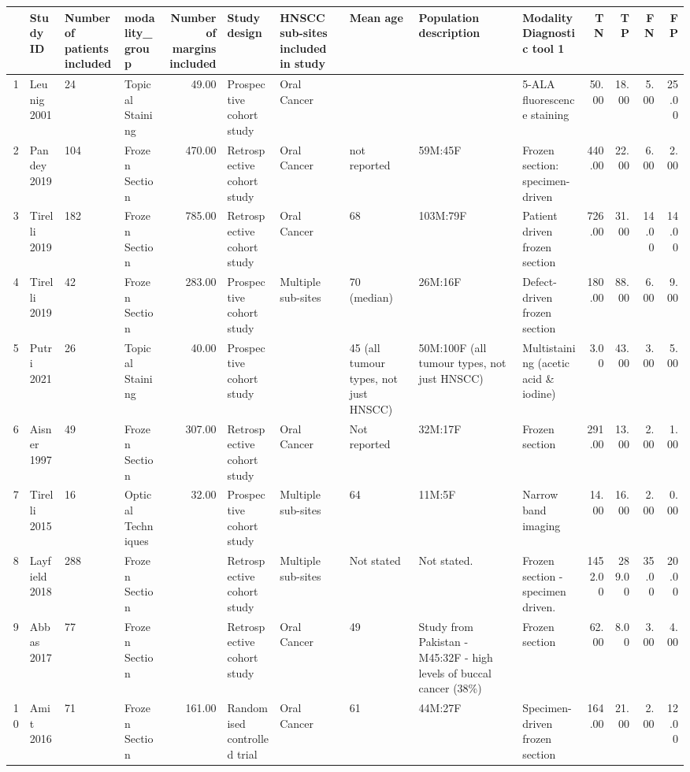 \begin{table}[ht]
\centering
\begingroup\tiny
\begin{tabular}{rlllrlllllrrrr}
  \hline
 & Study ID & Number of patients included & modality\_group & Number of margins included & Study design & HNSCC sub-sites included in study & Mean age & Population description & Modality Diagnostic tool 1 & TN & TP & FN & FP \\ 
  \hline
1 & Leunig 2001 & 24 & Topical Staining & 49.00 & Prospective cohort study & Oral Cancer &  &  & 5-ALA fluorescence staining & 50.00 & 18.00 & 5.00 & 25.00 \\ 
  2 & Pandey 2019 & 104 & Frozen Section & 470.00 & Retrospective cohort study & Oral Cancer & not reported & 59M:45F & Frozen section: specimen-driven & 440.00 & 22.00 & 6.00 & 2.00 \\ 
  3 & Tirelli 2019 & 182 & Frozen Section & 785.00 & Retrospective cohort study & Oral Cancer & 68 & 103M:79F & Patient driven frozen section & 726.00 & 31.00 & 14.00 & 14.00 \\ 
  4 & Tirelli 2019 & 42 & Frozen Section & 283.00 & Prospective cohort study & Multiple sub-sites & 70 (median) & 26M:16F & Defect-driven frozen section & 180.00 & 88.00 & 6.00 & 9.00 \\ 
  5 & Putri 2021 & 26 & Topical Staining & 40.00 & Prospective cohort study &  & 45 (all tumour types, not just HNSCC) & 50M:100F (all tumour types, not just HNSCC) & Multistaining (acetic acid \& iodine) & 3.00 & 43.00 & 3.00 & 5.00 \\ 
  6 & Aisner 1997 & 49 & Frozen Section & 307.00 & Retrospective cohort study & Oral Cancer & Not reported & 32M:17F & Frozen section & 291.00 & 13.00 & 2.00 & 1.00 \\ 
  7 & Tirelli 2015 & 16 & Optical Techniques & 32.00 & Prospective cohort study & Multiple sub-sites & 64 & 11M:5F & Narrow band imaging & 14.00 & 16.00 & 2.00 & 0.00 \\ 
  8 & Layfield 2018 & 288 & Frozen Section &  & Retrospective cohort study & Multiple sub-sites & Not stated & Not stated. & Frozen section -specimen driven. & 1452.00 & 289.00 & 35.00 & 20.00 \\ 
  9 & Abbas 2017 & 77 & Frozen Section &  & Retrospective cohort study & Oral Cancer & 49 & Study from Pakistan - M45:32F - high levels of buccal cancer (38\%) & Frozen section & 62.00 & 8.00 & 3.00 & 4.00 \\ 
  10 & Amit 2016 & 71 & Frozen Section & 161.00 & Randomised controlled trial & Oral Cancer & 61 & 44M:27F & Specimen-driven frozen section & 164.00 & 21.00 & 2.00 & 12.00 \\ 

\end{tabular}
\end{table}
